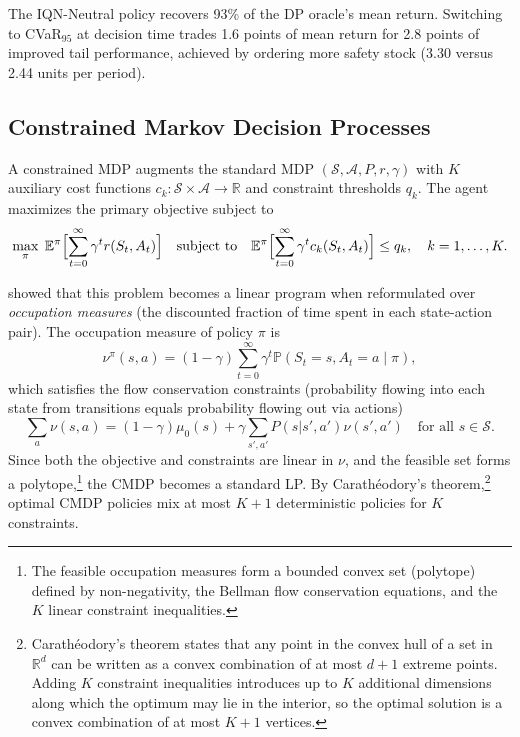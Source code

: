 The IQN-Neutral policy recovers 93\% of the DP oracle's mean return.
Switching to CVaR$_{95}$ at decision time trades 1.6 points of mean
return for 2.8 points of improved tail performance, achieved by
ordering more safety stock (3.30 versus 2.44 units per period).



\subsection{Constrained Markov Decision Processes}
\label{subsec:constrained_mdps}

A constrained MDP augments the standard MDP
$(\mathcal{S}, \mathcal{A}, P, r, \gamma)$ with $K$ auxiliary cost
functions $c_k: \mathcal{S} \times \mathcal{A} \to \mathbb{R}$ and
constraint thresholds $q_k$. The agent maximizes the primary objective
subject to
\begin{equation}
  \max_\pi \; \mathbb{E}^\pi\Bigl[\sum_{t=0}^\infty \gamma^t r(S_t, A_t)\Bigr]
  \quad \text{subject to} \quad
  \mathbb{E}^\pi\Bigl[\sum_{t=0}^\infty \gamma^t c_k(S_t, A_t)\Bigr]
  \leq q_k, \quad k = 1, \ldots, K.
  \label{eq:cmdp}
\end{equation}

\citet{Altman1999} showed that this problem becomes a linear
program when reformulated over \emph{occupation measures} (the discounted fraction of
time spent in each state-action pair). The occupation measure of policy
$\pi$ is
\begin{equation}
  \nu^\pi(s,a) = (1-\gamma) \sum_{t=0}^\infty \gamma^t
  \mathbb{P}(S_t = s, A_t = a \mid \pi),
  \label{eq:occupation_measure}
\end{equation}
which satisfies the flow conservation constraints (probability flowing
into each state from transitions equals probability flowing out via
actions)
\begin{equation}
  \sum_a \nu(s,a) = (1-\gamma)\mu_0(s) + \gamma \sum_{s',a'} P(s|s',a')
  \nu(s',a') \quad \text{for all } s \in \mathcal{S}.
  \label{eq:bellman_flow}
\end{equation}
Since both the objective and
constraints are linear in $\nu$, and the feasible set forms a
polytope,\footnote{The feasible occupation measures form a bounded convex
set (polytope) defined by non-negativity, the Bellman flow conservation
equations, and the $K$ linear constraint inequalities.} the CMDP becomes a
standard LP. By Carath\'eodory's theorem,\footnote{Carath\'eodory's theorem
states that any point in the convex hull of a set in $\mathbb{R}^d$ can be
written as a convex combination of at most $d+1$ extreme points. Adding $K$
constraint inequalities introduces up to $K$ additional dimensions along
which the optimum may lie in the interior, so the optimal solution is a
convex combination of at most $K+1$ vertices.}
optimal CMDP policies mix at most $K+1$ deterministic policies for $K$
constraints.

